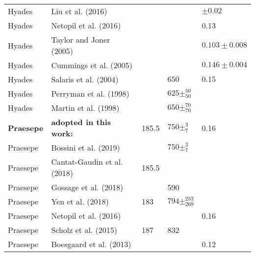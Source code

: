 \begin{table*}
\begin{tabular}{lllll}
 Hyades      &             Liu et al. (2016)         &               &                                      &  $               \pm 0.02  $ \\
 Hyades      &             Netopil et al. (2016)     &               &                                      &               0.13           \\
 Hyades      &             Taylor and Joner (2005)   &               &                                      &  $ 0.103         \pm 0.008 $ \\
 Hyades      &             Cummings et al. (2005)    &               &                                      &  $ 0.146         \pm 0.004 $ \\
 Hyades      &             Salaris et al. (2004)     &               &  $650$                               &  $ 0.15$                      \\
 Hyades      &             Perryman et al. (1998)    &               &  $ 625       \pm _{ 50}^{50       }$ &                              \\
 Hyades      &             Martin et al. (1998)      &               &  $ 650       \pm _{ 70}^{70       }$ &                              
\\\hline 
\textbf{Praesepe} & \textbf{adopted in this work:}   &     185.5     &  $ 750\pm _{7}^{ 3 }$                &              0.16            \\
 Praesepe    &             Bossini et al. (2019)     &               &                 $ 750\pm _{7}^{ 3 }$ &                              \\
 Praesepe    &           Cantat-Gaudin et al. (2018) &     185.5     &                                      &                              \\
 Praesepe    &             Gossage et al. (2018)     &               &                           590        &                              \\
 Praesepe    &             Yen et al. (2018)         &     183       &  $ 794       \pm _{ 269}^{253     }$ &                              \\
 Praesepe    &             Netopil et al. (2016)     &               &                                      &               0.16           \\
 Praesepe    &             Scholz et al. (2015)      &     187       &                           832        &                              \\
 Praesepe    &             Boesgaard et al. (2013)   &               &                                      &               0.12           \\

\end{tabular}
\end{table*}
